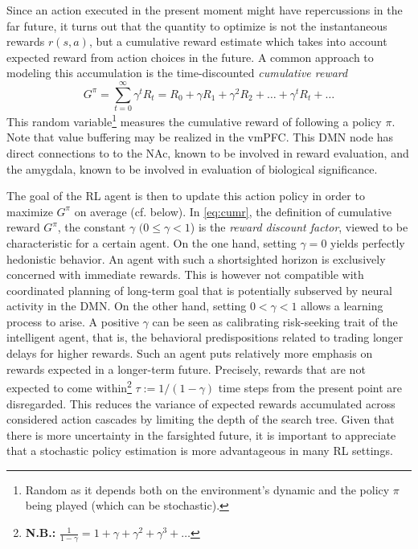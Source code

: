 \documentclass[10pt,letterpaper]{article}
\begin{document}
Since an action executed in the present moment might have repercussions in the far future, it turns out that the
quantity to optimize is not the instantaneous rewards $r(s, a)$, but a
cumulative reward estimate which takes into account expected reward
from action choices in the future.
A common approach to
modeling this accumulation is the time-discounted \textit{cumulative reward}%
\begin{equation}
  \label{eq:cumr}
  G^\pi = \sum_{t=0}^{\infty}\gamma^{t}R_t = R_0 + \gamma R_1 + \gamma^2 R_2 + \ldots + \gamma^tR_t + \ldots
\end{equation}
This random variable\footnote{Random as it depends both on the environment's dynamic and the
  policy $\pi$ being played (which can be stochastic).}  measures the cumulative reward of
following a policy $\pi$.
%
Note that value buffering may be realized in the vmPFC.
This DMN node has direct connections to
to the NAc, known to be involved in reward evaluation,
and
the amygdala, known to be involved in evaluation of biological significance.


The goal of the RL agent is then to update this action policy in order
to maximize $G^\pi$ on average (cf. below). In \eqref{eq:cumr},
the definition of cumulative reward $G^\pi$,
the constant $\gamma$ $(0 \le \gamma < 1$) is the \textit{reward discount factor},
viewed to be characteristic for a certain agent.
On the one hand,
setting $\gamma = 0$ yields perfectly hedonistic behavior.
An agent with such a shortsighted horizon is exclusively
concerned with immediate rewards.
This is however not compatible with coordinated planning of long-term goal that is
potentially subserved by neural activity in the DMN.
On the other hand,
setting $0 < \gamma < 1$ allows a learning process to arise.
A positive $\gamma$ can be seen as calibrating risk-seeking trait of the intelligent agent,
that is, the behavioral predispositions related to trading longer delays for higher rewards.
Such an agent puts relatively more emphasis on rewards expected in
a longer-term future. 
Precisely, rewards that are not expected to come within\footnote{\textbf{N.B.:} $\frac{1}{1-\gamma} = 1 + \gamma + \gamma^2 + \gamma^3 + \ldots$}
$\tau := 1/(1 - \gamma)$
time steps from the present point are disregarded. This reduces the variance of expected rewards accumulated across
considered action cascades by limiting the depth of the search tree.
Given that there is more uncertainty in the farsighted future,
it is important to appreciate that a stochastic policy estimation
is more advantageous in many RL settings.
\end{document}
